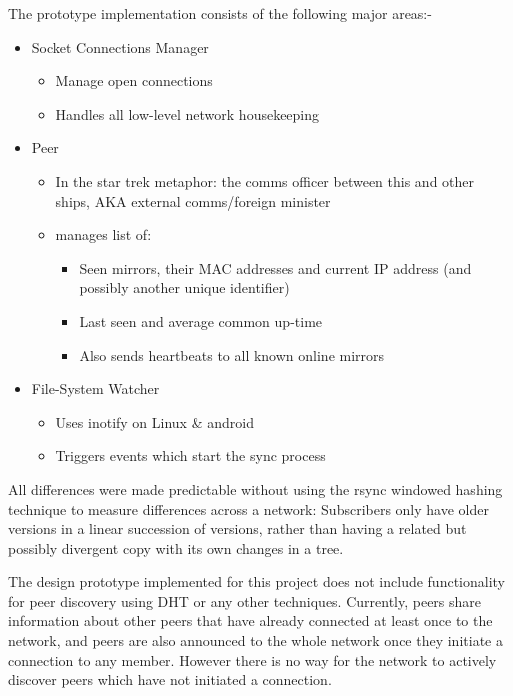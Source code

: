 \documentclass[12pt,a4paper,]{adreport}
\begin{document}
The prototype implementation consists of the following major areas:-

\begin{itemize}
\itemsep1pt\parskip0pt
\item
  Socket Connections Manager

  \begin{itemize}
  \itemsep1pt\parskip0pt
  \item
    Manage open connections
  \item
    Handles all low-level network housekeeping
  \end{itemize}
\item
  Peer

  \begin{itemize}
  \itemsep1pt\parskip0pt
  \item
    In the star trek metaphor: the comms officer between this and other
    ships, AKA external comms/foreign minister
  \item
    manages list of:

    \begin{itemize}
    \itemsep1pt\parskip0pt
    \item
      Seen mirrors, their MAC addresses and current IP address (and
      possibly another unique identifier)
    \item
      Last seen and average common up-time
    \item
      Also sends heartbeats to all known online mirrors
    \end{itemize}
  \end{itemize}
\item
  File-System Watcher

  \begin{itemize}
  \itemsep1pt\parskip0pt
  \item
    Uses inotify on Linux \& android
  \item
    Triggers events which start the sync process
  \end{itemize}
\end{itemize}

All differences were made predictable without using the rsync windowed
hashing technique to measure differences across a network: Subscribers
only have older versions in a linear succession of versions, rather than
having a related but possibly divergent copy with its own changes in a
tree.

The design prototype implemented for this project does not include
functionality for peer discovery using DHT or any other techniques.
Currently, peers share information about other peers that have already
connected at least once to the network, and peers are also announced to
the whole network once they initiate a connection to any member. However
there is no way for the network to actively discover peers which have
not initiated a connection.
\end{document}
